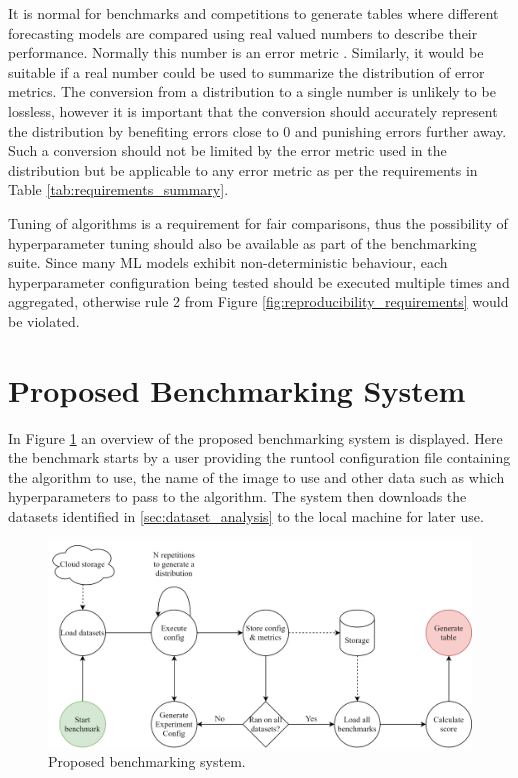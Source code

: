 It is normal for benchmarks and competitions to generate tables where different forecasting models are compared using real valued numbers to describe their performance. Normally this number is an error metric \cite{m3_competition,makridakis_m4_2020,m5,hyndman_forecasting_3rd,salinas_deepar_2019,oreshkin_n_beats_2020}. Similarly, it would be suitable if a real number could be used to summarize the distribution of error metrics. The conversion from a distribution to a single number is unlikely to be lossless, however it is important that the conversion should accurately represent the distribution by benefiting errors close to 0 and punishing errors further away. Such a conversion should not be limited by the error metric used in the distribution but be applicable to any error metric as per the requirements in Table \ref{tab:requirements_summary}.

Tuning of algorithms is a requirement for fair comparisons, thus the possibility of hyperparameter tuning should also be available as part of the benchmarking suite. Since many ML models exhibit non-deterministic behaviour, each hyperparameter configuration being tested should be executed multiple times and aggregated, otherwise rule 2 from Figure \ref{fig:reproducibility_requirements} would be violated.

\section{Proposed Benchmarking System}
In Figure \ref{fig:proposed_benchmarking_system} an overview of the proposed benchmarking system is displayed. Here the benchmark starts by a user providing the runtool configuration file containing the algorithm to use, the name of the image to use and other data such as which hyperparameters to pass to the algorithm. The system then downloads the datasets identified in \ref{sec:dataset_analysis} to the local machine for later use.
\begin{figure}[h]
  \centering
  \includegraphics[width=\linewidth]{./img/benchmarking_system_architecture.png}
  \caption{Proposed benchmarking system.}
  \label{fig:proposed_benchmarking_system}
\end{figure}

